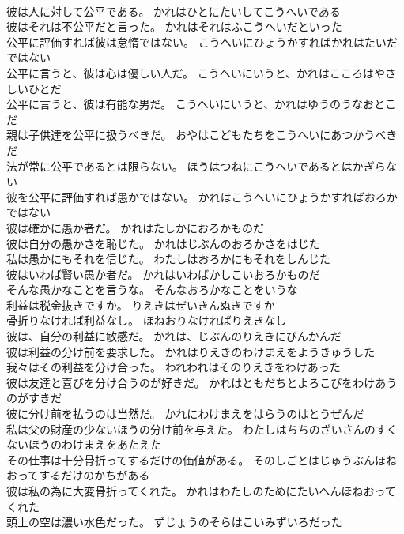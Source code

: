 \documentclass[8pt]{extreport}
\begin{document}
\begin{CJK}{UTF8}{min}
\\	彼は人に対して公平である。	かれはひとにたいしてこうへいである 
\\	彼はそれは不公平だと言った。	かれはそれはふこうへいだといった 
\\	公平に評価すれば彼は怠惰ではない。	こうへいにひょうかすればかれはたいだではない 
\\	公平に言うと、彼は心は優しい人だ。	こうへいにいうと、かれはこころはやさしいひとだ 
\\	公平に言うと、彼は有能な男だ。	こうへいにいうと、かれはゆうのうなおとこだ 
\\	親は子供達を公平に扱うべきだ。	おやはこどもたちをこうへいにあつかうべきだ 
\\	法が常に公平であるとは限らない。	ほうはつねにこうへいであるとはかぎらない 
\\	彼を公平に評価すれば愚かではない。	かれはこうへいにひょうかすればおろかではない 
\\	彼は確かに愚か者だ。	かれはたしかにおろかものだ 
\\	彼は自分の愚かさを恥じた。	かれはじぶんのおろかさをはじた 
\\	私は愚かにもそれを信じた。	わたしはおろかにもそれをしんじた 
\\	彼はいわば賢い愚か者だ。	かれはいわばかしこいおろかものだ 
\\	そんな愚かなことを言うな。	そんなおろかなことをいうな 
\\	利益は税金抜きですか。	りえきはぜいきんぬきですか 
\\	骨折りなければ利益なし。	ほねおりなければりえきなし 
\\	彼は、自分の利益に敏感だ。	かれは、じぶんのりえきにびんかんだ 
\\	彼は利益の分け前を要求した。	かれはりえきのわけまえをようきゅうした 
\\	我々はその利益を分け合った。	われわれはそのりえきをわけあった 
\\	彼は友達と喜びを分け合うのが好きだ。	かれはともだちとよろこびをわけあうのがすきだ 
\\	彼に分け前を払うのは当然だ。	かれにわけまえをはらうのはとうぜんだ 
\\	私は父の財産の少ないほうの分け前を与えた。	わたしはちちのざいさんのすくないほうのわけまえをあたえた 
\\	その仕事は十分骨折ってするだけの価値がある。	そのしごとはじゅうぶんほねおってするだけのかちがある 
\\	彼は私の為に大変骨折ってくれた。	かれはわたしのためにたいへんほねおってくれた 
\\	頭上の空は濃い水色だった。	ずじょうのそらはこいみずいろだった 

\end{CJK}
\end{document}
